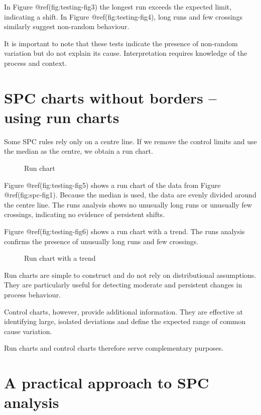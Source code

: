 \documentclass[
]{book}
\makeatletter
\newcommand*\pandocbounded[1]{%
  \sbox\pandoc@box{#1}%
  \Gscale@div\@tempa{\textheight}{\dimexpr\ht\pandoc@box+\dp\pandoc@box\relax}%
  \Gscale@div\@tempb{\linewidth}{\wd\pandoc@box}%
  \ifdim\@tempb\p@<\@tempa\p@\let\@tempa\@tempb\fi%
  \ifdim\@tempa\p@<\p@\scalebox{\@tempa}{\usebox\pandoc@box}%
  \else\usebox{\pandoc@box}%
  \fi%
}
\makeatother
\begin{document}
In Figure @ref(fig:testing-fig3) the longest run exceeds the expected
limit, indicating a shift. In Figure @ref(fig:testing-fig4), long runs
and few crossings similarly suggest non-random behaviour.

It is important to note that these tests indicate the presence of
non-random variation but do not explain its cause. Interpretation
requires knowledge of the process and context.

\section{SPC charts without borders -- using run
charts}\label{spc-charts-without-borders-using-run-charts}

Some SPC rules rely only on a centre line. If we remove the control
limits and use the median as the centre, we obtain a run chart.

\begin{figure}
\centering
\pandocbounded{}
\caption{Run chart}
\end{figure}

Figure @ref(fig:testing-fig5) shows a run chart of the data from Figure
@ref(fig:spc-fig1). Because the median is used, the data are evenly
divided around the centre line. The runs analysis shows no unusually
long runs or unusually few crossings, indicating no evidence of
persistent shifts.

Figure @ref(fig:testing-fig6) shows a run chart with a trend. The runs
analysis confirms the presence of unusually long runs and few crossings.

\begin{figure}
\centering
\pandocbounded{}
\caption{Run chart with a trend}
\end{figure}

Run charts are simple to construct and do not rely on distributional
assumptions. They are particularly useful for detecting moderate and
persistent changes in process behaviour.

Control charts, however, provide additional information. They are
effective at identifying large, isolated deviations and define the
expected range of common cause variation.

Run charts and control charts therefore serve complementary purposes.

\section{A practical approach to SPC
analysis}\label{a-practical-approach-to-spc-analysis}
\end{document}
